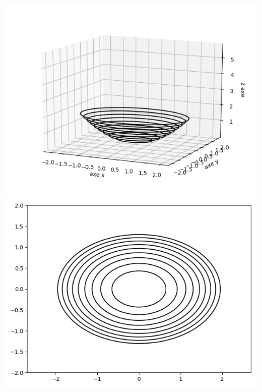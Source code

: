 \documentclass[11pt,class=report,crop=false]{standalone}
\begin{document}
\begin{exemple}
\begin{center}
\includegraphics[scale=\myscale,scale=0.5]{figures/fonctions-quadra-1d}
\includegraphics[scale=\myscale,scale=0.5]{figures/fonctions-quadra-1e}
\end{center}


\end{exemple}
\end{document}
